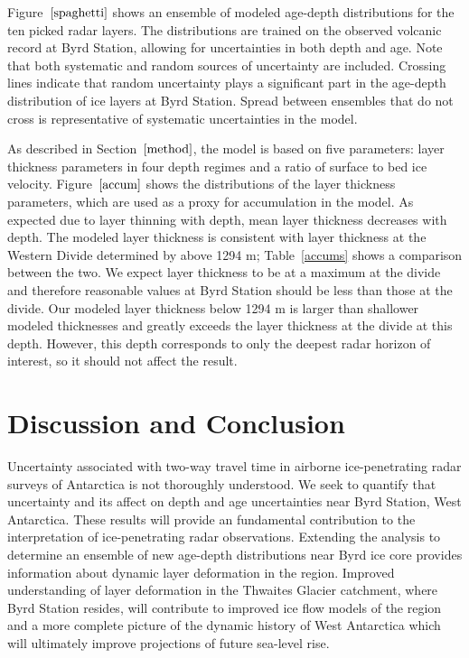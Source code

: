 \documentclass[draft,jgrga]{agutex}
\begin{document}
\begin{article}
Figure~$\ref{spaghetti}$ shows an ensemble of modeled age-depth distributions for the ten picked radar layers. The distributions are trained on the observed volcanic record at Byrd Station, allowing for uncertainties in both depth and age. Note that both systematic and random sources of uncertainty are included. Crossing lines indicate that random uncertainty plays a significant part in the age-depth distribution of ice layers at Byrd Station. Spread between ensembles that do not cross is representative of systematic uncertainties in the model. 

As described in Section~$\ref{method}$, the model is based on five parameters: layer thickness parameters in four depth regimes and a ratio of surface to bed ice velocity. Figure~$\ref{accum}$ shows the distributions of the layer thickness parameters, which are used as a proxy for accumulation in the model. As expected due to layer thinning with depth, mean layer thickness decreases with depth. The modeled layer thickness is consistent with layer thickness at the Western Divide determined by \citep{neumann2008} above 1294 m; Table~\ref{accums} shows a comparison between the two. We expect layer thickness to be at a maximum at the divide and therefore reasonable values at Byrd Station should be less than those at the divide. Our modeled layer thickness below 1294 m is larger than shallower modeled thicknesses and greatly exceeds the layer thickness at the divide at this depth. However, this depth corresponds to only the deepest radar horizon of interest, so it should not affect the result.

\section{Discussion and Conclusion}
Uncertainty associated with two-way travel time in airborne ice-penetrating radar surveys of Antarctica is not thoroughly understood. We seek to quantify that uncertainty and its affect on depth and age uncertainties near Byrd Station, West Antarctica. These results will provide an fundamental contribution to the interpretation of ice-penetrating radar observations. Extending the analysis to determine an ensemble of new age-depth distributions near Byrd ice core provides information about dynamic layer deformation in the region. Improved understanding of layer deformation in the Thwaites Glacier catchment, where Byrd Station resides, will contribute to improved ice flow models of the region and a more complete picture of the dynamic history of West Antarctica which will ultimately improve projections of future sea-level rise. 


\end{article}
\end{document}
